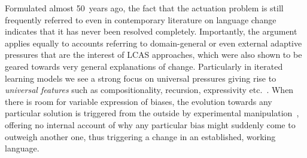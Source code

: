 Formulated almost 50~years ago, the fact that the actuation problem is still frequently referred to even in contemporary literature on language change indicates that it has never been resolved completely. Importantly, the argument applies equally to accounts referring to domain-general or even external adaptive pressures that are the interest of LCAS approaches, which were also shown to be geared towards very general explanations of change. Particularly in iterated learning models we see a strong focus on universal pressures giving rise to \emph{universal features} such as compositionality, recursion, expressivity etc.~\citep{Brighton2002,Kirby2002,Cornish2009,Smith2013}. %
When there is room for variable expression of biases, the evolution towards any particular solution is triggered from the outside by experimental manipulation~\citep{Winters2015}, offering no internal account of why any particular bias might suddenly come to outweigh another one, thus triggering a change in an established, working language.

